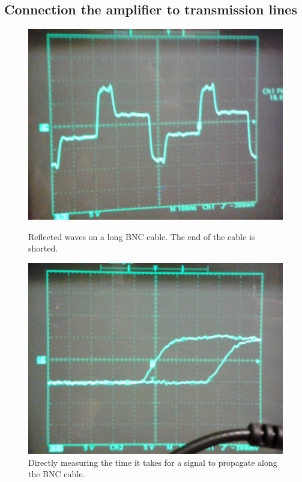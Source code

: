 \documentclass[11pt,letterpaper]{article}
\begin{document}
\subsection{Connection the amplifier to transmission lines}

\begin{figure}
    \centering
    \begin{minipage}[t]{0.45\textwidth}
        \centering
        \includegraphics[width=\textwidth]{figures/reflection.jpg}
        \caption{Reflected waves on a long BNC cable. The end of the cable is
            shorted.}
        \label{reflected}
    \end{minipage}
    \hspace{0.5cm}
    \begin{minipage}[t]{0.45\textwidth}
        \centering
        \includegraphics[width=\textwidth]{figures/speed.jpg}
        \caption{Directly measuring the time it takes for a signal to propagate
            along the BNC cable.}
        \label{speed}
    \end{minipage}
\end{figure}
\end{document}
